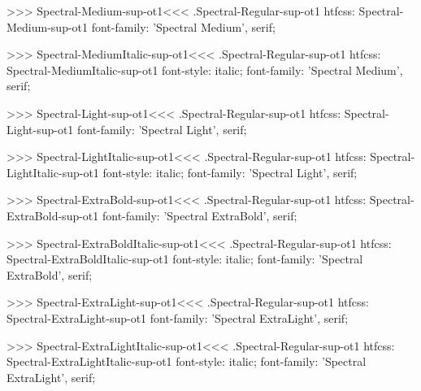 >>>
\<Spectral-Medium-sup-ot1\><<<
.Spectral-Regular-sup-ot1
htfcss:  Spectral-Medium-sup-ot1  font-family: 'Spectral Medium', serif;

>>>
\<Spectral-MediumItalic-sup-ot1\><<<
.Spectral-Regular-sup-ot1
htfcss:  Spectral-MediumItalic-sup-ot1  font-style: italic; font-family: 'Spectral Medium', serif;

>>>
\<Spectral-Light-sup-ot1\><<<
.Spectral-Regular-sup-ot1
htfcss:  Spectral-Light-sup-ot1  font-family: 'Spectral Light', serif;

>>>
\<Spectral-LightItalic-sup-ot1\><<<
.Spectral-Regular-sup-ot1
htfcss:  Spectral-LightItalic-sup-ot1  font-style: italic; font-family: 'Spectral Light', serif;

>>>
\<Spectral-ExtraBold-sup-ot1\><<<
.Spectral-Regular-sup-ot1
htfcss:  Spectral-ExtraBold-sup-ot1  font-family: 'Spectral ExtraBold', serif;

>>>
\<Spectral-ExtraBoldItalic-sup-ot1\><<<
.Spectral-Regular-sup-ot1
htfcss:  Spectral-ExtraBoldItalic-sup-ot1  font-style: italic; font-family: 'Spectral ExtraBold', serif;

>>>
\<Spectral-ExtraLight-sup-ot1\><<<
.Spectral-Regular-sup-ot1
htfcss:  Spectral-ExtraLight-sup-ot1  font-family: 'Spectral ExtraLight', serif;

>>>
\<Spectral-ExtraLightItalic-sup-ot1\><<<
.Spectral-Regular-sup-ot1
htfcss:  Spectral-ExtraLightItalic-sup-ot1  font-style: italic; font-family: 'Spectral ExtraLight', serif;

